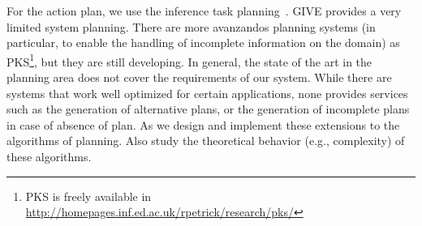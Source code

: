 For the action plan, we use the inference task planning~\cite{nau04}. GIVE
provides a very limited system planning. There are more avanzandos
planning systems (in particular, to enable the handling of incomplete
information on the domain) as
PKS\footnote{PKS is
freely available in \url{http://homepages.inf.ed.ac.uk/rpetrick/research/pks/}},
but they are still developing. In general,
the state of the art in the planning area does not cover the requirements of our
system. While there are systems that work well optimized for certain
applications, none provides services such as the generation of alternative
plans, or the generation of incomplete plans in case of absence of plan. As we
design and implement these extensions to the algorithms of planning. Also study
the theoretical behavior (e.g., complexity) of these algorithms. 
% 

